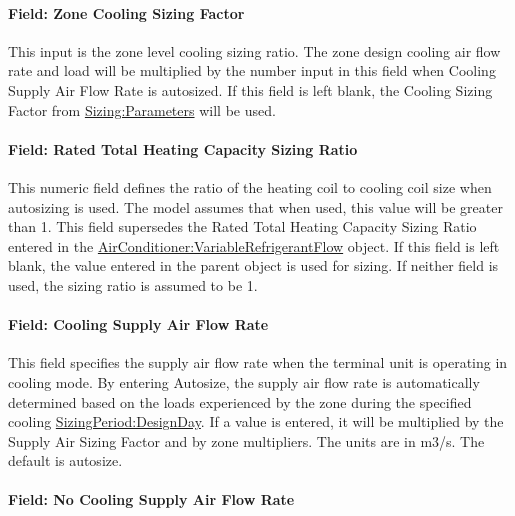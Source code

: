 \paragraph{Field: Zone Cooling Sizing Factor}\label{field-zone-cooling-sizing-factor-4}

This input is the zone level cooling sizing ratio. The zone design cooling air flow rate and load will be multiplied by the number input in this field when Cooling Supply Air Flow Rate is autosized. If this field is left blank, the Cooling Sizing Factor from \hyperref[sizingparameters]{Sizing:Parameters} will be used.

\paragraph{Field: Rated Total Heating Capacity Sizing Ratio}\label{field-rated-total-heating-capacity-sizing-ratio}

This numeric field defines the ratio of the heating coil to cooling coil size when autosizing is used. The model assumes that when used, this value will be greater than 1. This field supersedes the Rated Total Heating Capacity Sizing Ratio entered in the \hyperref[airconditionervariablerefrigerantflow]{AirConditioner:VariableRefrigerantFlow} object. If this field is left blank, the value entered in the parent object is used for sizing. If neither field is used, the sizing ratio is assumed to be 1.

\paragraph{Field: Cooling Supply Air Flow Rate}\label{field-cooling-supply-air-flow-rate-3}

This field specifies the supply air flow rate when the terminal unit is operating in cooling mode. By entering Autosize, the supply air flow rate is automatically determined based on the loads experienced by the zone during the specified cooling \hyperref[sizingperioddesignday]{SizingPeriod:DesignDay}. If a value is entered, it will be multiplied by the Supply Air Sizing Factor and by zone multipliers. The units are in m3/s. The default is autosize.

\paragraph{Field: No Cooling Supply Air Flow Rate}\label{field-no-cooling-supply-air-flow-rate}

